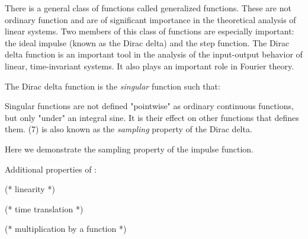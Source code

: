 \documentclass{article}
\begin{document}
\begin{CellGroup}


There is a general class of functions called generalized functions. These are not ordinary function and are of significant importance in the theoretical
 analysis of linear systems. Two members of this class of functions are  especially important: the ideal impulse (known as the Dirac delta) and the
 step function. The Dirac delta function is an important tool in the analysis  of the input-output behavior of linear, time-invariant systems. It
also  plays an important role in Fourier theory.

\begin{CellGroup}
The Dirac delta function  is the {\itshape singular} function such that:




Singular functions are not defined "pointwise" as ordinary continuous functions, but only "under" an integral sine. It is their effect on other functions
that defines them. (7) is also known as the {\itshape sampling} property of the Dirac delta.



Here we demonstrate the sampling property of the impulse function.

\begin{CellGroup}

\end{CellGroup}
Additional properties of :



		(* linearity *)

		(* time translation *)

		(* multiplication by a function *)


\end{CellGroup}
\end{CellGroup}
\end{document}
